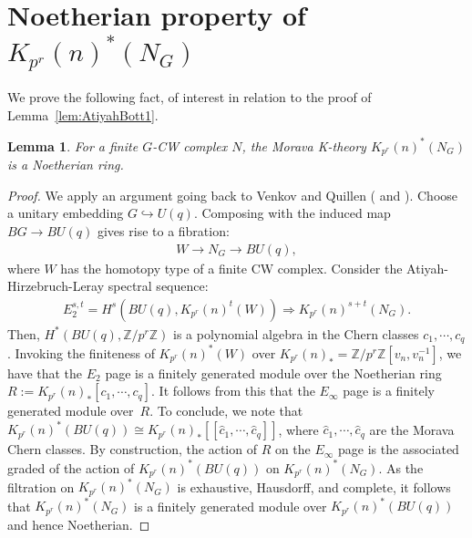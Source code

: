\documentclass[11pt, reqno]{amsart}
\theoremstyle{plain}
\newtheorem{lem}[thm]{Lemma}
\theoremstyle{definition}
\begin{document}
\section{Noetherian property of $K_{p^r}(n)^*(N_G)$} \label{section:Noetherian}
We prove the following fact, of interest in relation to the proof of 
Lemma~\ref{lem:AtiyahBott1}.

\begin{lem} \label{lem:Noetherian}  For a finite $G$-CW complex $N$,  
the Morava K-theory $K_{p^r}(n)^*(N_G)$ is a Noetherian ring.   \end{lem}
\begin{proof} 
We apply an argument going back to Venkov and Quillen (\cite{Venkov} and \cite[\S 2]{Quillen}).  
Choose a unitary embedding $G \hookrightarrow U(q).$  Composing with the induced map 
$ BG \to BU(q)$ gives rise to a fibration: \begin{align} W \to N_G \to BU(q), \end{align} where 
$W$ has the homotopy type of a finite CW complex.  Consider the Atiyah-Hirzebruch-Leray spectral 
sequence: 
\begin{align} 
E_2^{s,t}= H^s(BU(q), K_{p^r}(n)^t(W)) \Rightarrow K_{p^r}(n)^{s+t}(N_G). 
\end{align} 
Then, $H^*(BU(q),\mathbb{Z}/p^r\mathbb{Z})$ 
is a polynomial algebra in the Chern classes $c_1,\cdots, c_q$. Invoking the finiteness of 
$K_{p^r}(n)^*(W)$ over $K_{p^r}(n)_{*}=\mathbb{Z}/p^r\mathbb{Z}[v_n,v_n^{-1}]$,  we have that the 
$E_2$ page is a finitely generated module over the Noetherian ring $R:=K_{p^r}(n)_{*}[c_1,\cdots,c_q]$.  
It follows from this that the $E_\infty$ page is a finitely generated module over~$R$.  
To conclude,  we note that $K_{p^r}(n)^*(BU(q)) \cong K_{p^r}(n)_{*}[[\hat{c}_1,\cdots,\hat{c}_q]]$,   
where $\hat{c}_1,\cdots,\hat{c}_q$ are the Morava Chern classes.  By construction,  the action 
of $R$ on the $E_\infty$ page is the associated graded of the action of  $K_{p^r}(n)^*(BU(q))$ on 
$K_{p^r}(n)^*(N_G)$.  As the filtration on  $K_{p^r}(n)^*(N_G)$ is exhaustive, Hausdorff, and complete,  
it follows that $K_{p^r}(n)^*(N_G)$ is a finitely generated module over $K_{p^r}(n)^*(BU(q))$
and hence Noetherian.
 \end{proof} 
\end{document}
